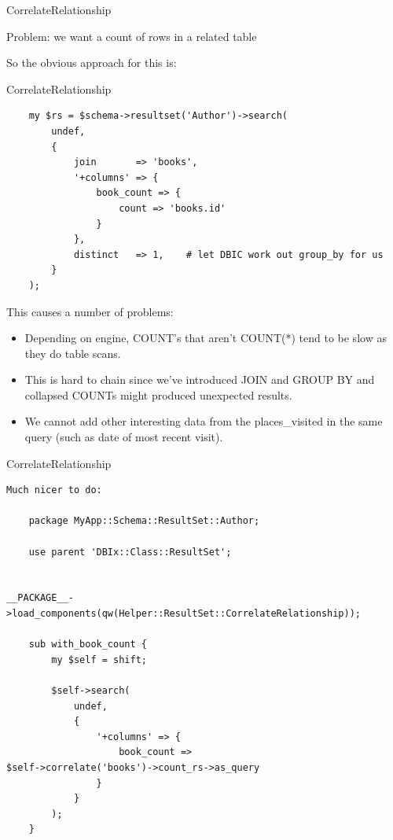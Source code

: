 \begin{frame}{CorrelateRelationship}

Problem: we want a count of rows in a related table

\end{frame}

So the obvious approach for this is:

\begin{frame}[fragile]{CorrelateRelationship}
\begin{lstlisting}
    my $rs = $schema->resultset('Author')->search(
        undef,
        {
            join       => 'books',
            '+columns' => {
                book_count => {
                    count => 'books.id'
                }
            },
            distinct   => 1,    # let DBIC work out group_by for us
        }
    );
\end{lstlisting}
\end{frame}
This causes a number of problems:

\begin{itemize}
\item Depending on engine, COUNT’s that aren’t COUNT(*) tend to be slow as
they do table scans.
\item This is hard to chain since we've introduced JOIN and GROUP BY and
collapsed COUNTs might produced unexpected results.
\item We cannot add other interesting data from the places\_visited in the same query (such as date of most recent visit).
\end{itemize}

\begin{frame}[fragile]{CorrelateRelationship}
\begin{lstlisting}
Much nicer to do:

    package MyApp::Schema::ResultSet::Author;

    use parent 'DBIx::Class::ResultSet';

   
__PACKAGE__->load_components(qw(Helper::ResultSet::CorrelateRelationship));

    sub with_book_count {
        my $self = shift;

        $self->search(
            undef,
            {
                '+columns' => {
                    book_count =>
$self->correlate('books')->count_rs->as_query
                }
            }
        );
    }
\end{lstlisting}
\end{frame}


